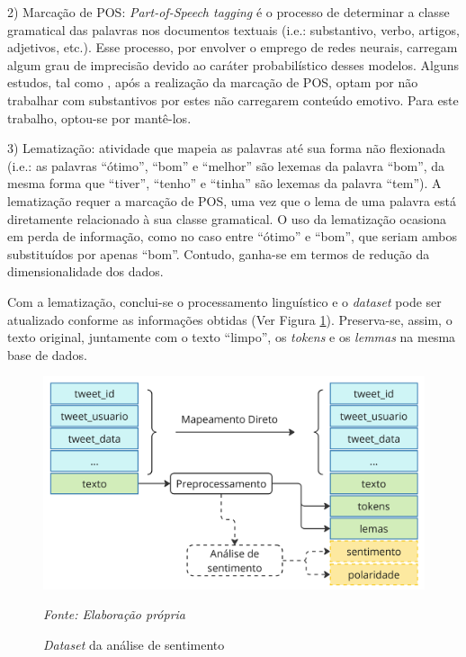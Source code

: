 \bigskip

2) Marcação de POS: \textit{Part-of-Speech tagging} é o processo de determinar a classe gramatical das palavras nos documentos textuais (i.e.: substantivo, verbo, artigos, adjetivos, etc.). Esse processo, por envolver o emprego de redes neurais, carregam algum grau de imprecisão devido ao caráter probabilístico desses modelos. Alguns estudos, tal como \textcite{de_melo_sentilexbr_2022}, após a realização da marcação de POS, optam por não trabalhar com substantivos por estes não carregarem conteúdo emotivo. Para este trabalho, optou-se por mantê-los.

\bigskip

3) Lematização: atividade que mapeia as palavras até sua forma não flexionada (i.e.: as palavras \enquote{ótimo}, \enquote{bom} e \enquote{melhor} são lexemas da palavra \enquote{bom}, da mesma forma que \enquote{tiver}, \enquote{tenho} e \enquote{tinha} são lexemas da palavra \enquote{tem}). A lematização requer a marcação de POS, uma vez que o lema de uma palavra está diretamente relacionado à sua classe gramatical. O uso da lematização ocasiona em perda de informação, como no caso entre \enquote{ótimo} e \enquote{bom}, que seriam ambos substituídos por apenas \enquote{bom}. Contudo, ganha-se em termos de redução da dimensionalidade dos dados.

\bigskip

Com a lematização, conclui-se o processamento linguístico e o \textit{dataset} pode ser atualizado conforme as informações obtidas (Ver Figura \ref{fig:dataset_preprocessado}). Preserva-se, assim, o texto original, juntamente com o texto \enquote{limpo}, os \textit{tokens} e os \textit{lemmas} na mesma base de dados. 

\begin{figure}[H]
    \captionsetup{position=above} %
    \caption{\textit{Dataset} da análise de sentimento}
    \centering
    \includegraphics[scale=0.050]{imagens/figura_dataset_preprocessado.jpg}
    \label{fig:dataset_preprocessado}
        \par\noindent
    \begin{minipage}{\textwidth}
        \centering
        \footnotesize %
        \textit{Fonte: Elaboração própria}
    \end{minipage}
\end{figure}

